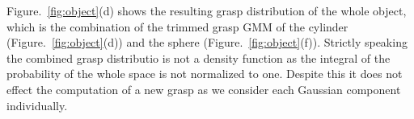 Figure.~\ref{fig:object}(d) shows the resulting grasp distribution of the whole object, which is the combination of the trimmed grasp GMM of the cylinder (Figure.~\ref{fig:object}(d)) and the sphere (Figure.~\ref{fig:object}(f)). Strictly speaking the combined grasp distributio is not a density function as the integral of the probability of the whole space is not normalized to one. Despite this it does not effect the computation of a new grasp as we consider each Gaussian component individually.

\begin{figure}
\centering
    \hspace{-1cm}
    \begin{minipage}[c]{1\textwidth}




\end{minipage}
\end{figure}
